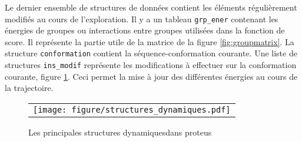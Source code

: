 Le dernier ensemble de structures de données contient les éléments régulièrement modifiés au cours de l'exploration.
Il y a un tableau  \verb!grp_ener! contenant les énergies de groupes ou interactions entre groupes utilisées dans la fonction de score. Il représente la partie utile de la matrice de la figure \ref{fig:groupmatrix}. La structure \verb!conformation! contient la séquence-conformation courante. Une liste de structures \verb!ins_modif! représente les modifications à effectuer sur la conformation courante, figure \ref{fig:structDyna}. Ceci permet la mise à jour des différentes énergies au cours de la trajectoire.   

   \begin{figure}[!htbp]
     \begin{tabular}{c}
       \texttt{[image: figure/structures\_dynamiques.pdf]} 
     \end{tabular}
     
     \caption{Les principales structures \og dynamiques\fg dans proteus}
\label{fig:structDyna}
   \end{figure}


